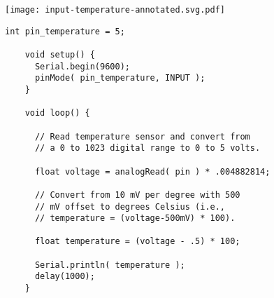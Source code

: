 \vspace{0.1in}
\begin{minipage}[t]{0.49\tw}
  \vspace{0.6in}

  \texttt{[image: input-temperature-annotated.svg.pdf]}
\end{minipage}
\hfill
\begin{minipage}[t]{0.49\tw}
  \vspace{0.1in}
  \begin{Verbatim}[gobble=3,fontsize=\small]
    int pin_temperature = 5;

    void setup() {
      Serial.begin(9600);
      pinMode( pin_temperature, INPUT );
    }

    void loop() {

      // Read temperature sensor and convert from
      // a 0 to 1023 digital range to 0 to 5 volts.

      float voltage = analogRead( pin ) * .004882814;

      // Convert from 10 mV per degree with 500
      // mV offset to degrees Celsius (i.e.,
      // temperature = (voltage-500mV) * 100).

      float temperature = (voltage - .5) * 100;

      Serial.println( temperature );
      delay(1000);
    }
  \end{Verbatim}
\end{minipage}
\vspace{0.1in}

